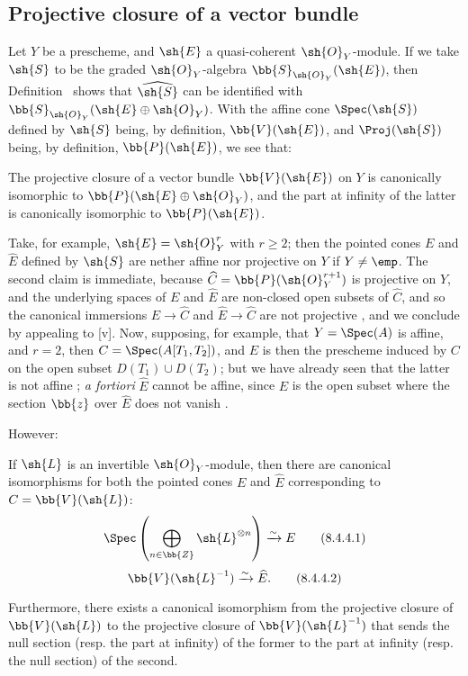 \subsection{Projective closure of a vector bundle}
\label{subsection:II.8.4}

\begin{env}[8.4.1]
\label{II.8.4.1}
Let $Y$ be a prescheme, and $\sh{E}$ a quasi-coherent $\sh{O}_Y$-module.
If we take $\sh{S}$ to be the graded $\sh{O}_Y$-algebra $\bb{S}_{\sh{O}_Y}(\sh{E})$, then Definition~ shows that $\widehat{\sh{S}}$ can be identified with $\bb{S}_{\sh{O}_Y}(\sh{E}\oplus\sh{O}_Y)$.
With the affine cone $\Spec(\sh{S})$ defined by $\sh{S}$ being, by definition, $\bb{V}(\sh{E})$, and $\Proj(\sh{S})$ being, by definition, $\bb{P}(\sh{E})$, we see that:
\end{env}
\begin{proposition}[8.4.2]
\label{II.8.4.2}
The projective closure of a vector bundle $\bb{V}(\sh{E})$ on $Y$ is canonically isomorphic to $\bb{P}(\sh{E}\oplus\sh{O}_Y)$, and the part at infinity of the latter is canonically isomorphic to $\bb{P}(\sh{E})$.
\end{proposition}

\begin{remark}[8.4.3]
\label{II.8.4.3}
Take, for example, $\sh{E}=\sh{O}_Y^r$ with $r\geq2$;
then the pointed cones $E$ and $\widehat{E}$ defined by $\sh{S}$ are nether affine nor projective on $Y$ if $Y\neq\emp$.
The second claim is immediate, because $\widehat{C}=\bb{P}(\sh{O}_Y^{r+1})$ is projective on $Y$, and the underlying spaces of $E$ and $\widehat{E}$ are non-closed open subsets of $\widehat{C}$, and so the canonical immersions $E\to\widehat{C}$ and $\widehat{E}\to\widehat{C}$ are not projective , and we conclude by appealing to [v].
Now, supposing, for example, that $Y=\Spec(A)$ is affine, and $r=2$, then $C=\Spec(A[T_1,T_2])$, and $E$ is then the prescheme induced by $C$ on the open subset $D(T_1)\cup D(T_2)$;
but we have already seen that the latter is not affine ;
\emph{a fortiori} $\widehat{E}$ cannot be affine, since $E$ is the open subset where the section $\bb{z}$ over $\widehat{E}$ does not vanish .

However:
\end{remark}
\begin{proposition}[8.4.4]
\label{II.8.4.4}
If $\sh{L}$ is an invertible $\sh{O}_Y$-module, then there are canonical isomorphisms for both the pointed cones $E$ and $\widehat{E}$ corresponding to $C=\bb{V}(\sh{L})$:
\[
\label{eq:2.8.4.4.1}
  \Spec\left(
    \bigoplus_{n\in\bb{Z}}\sh{L}^{\otimes n}
  \right)
  \xrightarrow{\sim}
  E
\tag{8.4.4.1}
\]
\[
\label{eq:2.8.4.4.2}
  \bb{V}(\sh{L}^{-1})
  \xrightarrow{\sim}
  \widehat{E}.
\tag{8.4.4.2}
\]

Furthermore, there exists a canonical isomorphism from the projective closure of $\bb{V}(\sh{L})$ to the projective closure of $\bb{V}(\sh{L}^{-1})$ that sends the null section (resp. the part at infinity) of the former to the part at infinity (resp. the null section) of the second.
\end{proposition}

